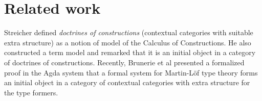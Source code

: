 \documentclass{mscs}
\newcommand{\s}{\mathrm{s}}
\newcommand{\Ta}{\mathrm{T}}
\newcommand{\Tan}{\Ta_n}
\newcommand{\Un}{\U_n}
\begin{document}
%
%
\section{Related work}

Streicher \cite{streicher:semtt} defined {\em doctrines of constructions} (contextual categories with suitable extra structure) as a notion of model of the Calculus of Constructions. He also constructed a term model and remarked that it is an initial object in a category of doctrines of constructions.
Recently, Brunerie et al \cite{brunerie:initiality} presented a formalized proof in the Agda system that a formal system for Martin-Löf type theory forms an initial object in a category of contextual categories with extra structure for
the type formers.
\end{document}
